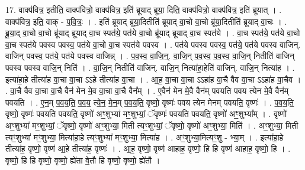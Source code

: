 \documentclass[17pt]{extarticle}
\begin{document}
17. वाक्प॑वित्र॒ इतीति॒ वाक्प॑वित्रो॒ वाक्प॑वित्र॒ इति॑ ब्रूयाद् ब्रूया॒ दिति॒ वाक्प॑वित्रो॒ वाक्प॑वित्र॒ इति॑ ब्रूयात् । . वाक्प॑वित्र॒ इति॒ वाक् - प॒वि॒त्रः॒ । . इति॑ ब्रूयाद् ब्रूया॒दितीति॑ ब्रूयाद् वा॒चो वा॒चो ब्रू॑या॒दितीति॑ ब्रूयाद् वा॒चः । . ब्रू॒या॒द् वा॒चो वा॒चो ब्रू॑याद् ब्रूयाद् वा॒च स्पत॑ये॒ पत॑ये वा॒चो ब्रू॑याद् ब्रूयाद् वा॒च स्पत॑ये । . वा॒च स्पत॑ये॒ पत॑ये वा॒चो वा॒च स्पत॑ये पवस्व पवस्व॒ पत॑ये वा॒चो वा॒च स्पत॑ये पवस्व । . पत॑ये पवस्व पवस्व॒ पत॑ये॒ पत॑ये पवस्व वाजिन्. वाजिन् पवस्व॒ पत॑ये॒ पत॑ये पवस्व वाजिन्न् । . प॒व॒स्व॒ वा॒जि॒न्॒. वा॒जि॒न् प॒व॒स्व॒ प॒व॒स्व॒ वा॒जि॒न् नितीति॑ वाजिन् पवस्व पवस्व वाजि॒न् निति॑ । . वा॒जि॒न् नितीति॑ वाजिन्. वाजि॒न् नित्या॑हा॒हेति॑ वाजिन्. वाजि॒न् नित्या॑ह । . इत्या॑हा॒हे तीत्या॑ह वा॒चा वा॒चा ऽऽहे तीत्या॑ह वा॒चा । . आ॒ह॒ वा॒चा वा॒चा ऽऽहा॑ह वा॒चै वैव वा॒चा ऽऽहा॑ह वा॒चैव । . वा॒चै वैव वा॒चा वा॒चै वैन॑ मेन मे॒व वा॒चा वा॒चै वैन᳚म् । . ए॒वैन॑ मेन मे॒वै वैन॑म् पवयति पवय त्येन मे॒वै वैन॑म् पवयति । . ए॒न॒म् प॒व॒य॒ति॒ प॒व॒य॒ त्ये॒न॒ मे॒न॒म् प॒व॒य॒ति॒ वृष्णो॒ वृष्णः॑ पवय त्येन मेनम् पवयति॒ वृष्णः॑ । . प॒व॒य॒ति॒ वृष्णो॒ वृष्णः॑ पवयति पवयति॒ वृष्णो॑ अꣳ॒॒शुभ्या॑ मꣳ॒॒शुभ्यां॒ ॅवृष्णः॑ पवयति पवयति॒ वृष्णो॑ अꣳ॒॒शुभ्या᳚म् । . वृष्णो॑ अꣳ॒॒शुभ्या॑ मꣳ॒॒शुभ्यां॒ ॅवृष्णो॒ वृष्णो॑ अꣳ॒॒शुभ्या॒ मिती त्यꣳ॒॒शुभ्यां॒ ॅवृष्णो॒ वृष्णो॑ अꣳ॒॒शुभ्या॒ मिति॑ । . अꣳ॒॒शुभ्या॒ मिती त्यꣳ॒॒शुभ्या॑ मꣳ॒॒शुभ्या॒ मित्या॑हा॒हे त्यꣳ॒॒शुभ्या॑ मꣳ॒॒शुभ्या॒ मित्या॑ह । . अꣳ॒॒शुभ्या॒मित्यꣳ॒॒शु - भ्या॒म् । . इत्या॑हा॒हे तीत्या॑ह॒ वृष्णो॒ वृष्ण॑ आ॒हे तीत्या॑ह॒ वृष्णः॑ । . आ॒ह॒ वृष्णो॒ वृष्ण॑ आहाह॒ वृष्णो॒ हि हि वृष्ण॑ आहाह॒ वृष्णो॒ हि । . वृष्णो॒ हि हि वृष्णो॒ वृष्णो॒ ह्ये॑ता वे॒तौ हि वृष्णो॒ वृष्णो॒ ह्ये॑तौ । \newline
\end{document}
